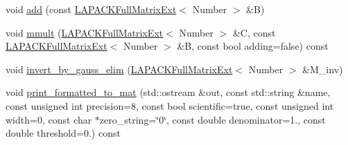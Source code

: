 \begin{DoxyCompactItemize}
\item 
void \hyperlink{classLAPACKFullMatrixExt_ae199890a11b5034d8ec2342c7de6c439}{add} (const \hyperlink{classLAPACKFullMatrixExt}{L\+A\+P\+A\+C\+K\+Full\+Matrix\+Ext}$<$ Number $>$ \&B)
\item 
void \hyperlink{classLAPACKFullMatrixExt_a176ae32c5467facafd5dcc3252c07c20}{mmult} (\hyperlink{classLAPACKFullMatrixExt}{L\+A\+P\+A\+C\+K\+Full\+Matrix\+Ext}$<$ Number $>$ \&C, const \hyperlink{classLAPACKFullMatrixExt}{L\+A\+P\+A\+C\+K\+Full\+Matrix\+Ext}$<$ Number $>$ \&B, const bool adding=false) const
\item 
void \hyperlink{classLAPACKFullMatrixExt_a13bbc430a0f60d4158d1693a2d7a0235}{invert\+\_\+by\+\_\+gauss\+\_\+elim} (\hyperlink{classLAPACKFullMatrixExt}{L\+A\+P\+A\+C\+K\+Full\+Matrix\+Ext}$<$ Number $>$ \&M\+\_\+inv)
\item 
void \hyperlink{classLAPACKFullMatrixExt_aae17980cb1bd3802fdc4a629040b6ed7}{print\+\_\+formatted\+\_\+to\+\_\+mat} (std\+::ostream \&out, const std\+::string \&name, const unsigned int precision=8, const bool scientific=true, const unsigned int width=0, const char $\ast$zero\+\_\+string=\char`\"{}0\char`\"{}, const double denominator=1., const double threshold=0.) const
\end{DoxyCompactItemize}
